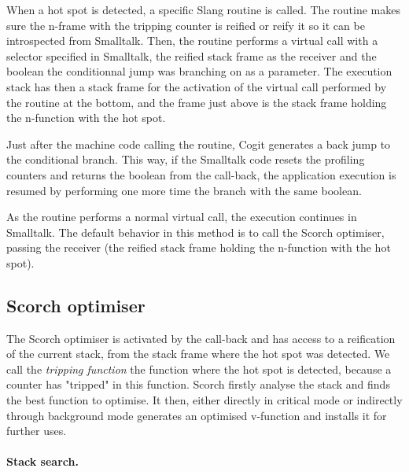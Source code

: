 \documentclass[a4paper,12pt,twoside]{../includes/ThesisStyle}
\begin{document}
When a hot spot is detected, a specific Slang routine is called. The routine makes sure the n-frame with the tripping counter is reified or reify it so it can be introspected from Smalltalk. Then, the routine performs a virtual call with a selector specified in Smalltalk, the reified stack frame as the receiver and the boolean the conditionnal jump was branching on as a parameter. The execution stack has then a stack frame for the activation of the virtual call performed by the routine at the bottom, and the frame just above is the stack frame holding the n-function with the hot spot.

Just after the machine code calling the routine, Cogit generates a back jump to the conditional branch. This way, if the Smalltalk code resets the profiling counters and returns the boolean from the call-back, the application execution is resumed by performing one more time the branch with the same boolean.


As the routine performs a normal virtual call, the execution continues in Smalltalk. The default behavior in this method is to call the Scorch optimiser, passing the receiver (the reified stack frame holding the n-function with the hot spot).

\subsection{Scorch optimiser}

The Scorch optimiser is activated by the call-back and has access to a reification of the current stack, from the stack frame where the hot spot was detected. We call the \emph{tripping function} the function where the hot spot is detected, because a counter has "tripped" in this function. Scorch firstly analyse the stack and finds the best function to optimise. It then, either directly in critical mode or indirectly through background mode generates an optimised v-function and installs it for further uses.

\paragraph{Stack search.}
\label{ss:stackSearch}
\end{document}
